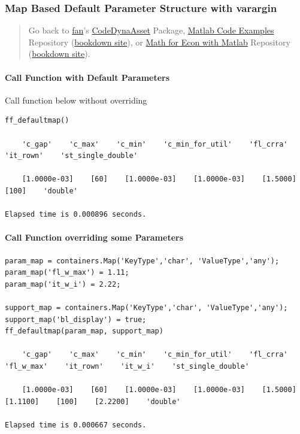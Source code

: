 \documentclass[
]{book}
\begin{document}
\hypertarget{map-based-default-parameter-structure-with-varargin}{%
\subsubsection{Map Based Default Parameter Structure with varargin}\label{map-based-default-parameter-structure-with-varargin}}

\begin{quote}
Go back to \href{http://fanwangecon.github.io/}{fan}'s \href{https://fanwangecon.github.io/CodeDynaAsset/}{CodeDynaAsset} Package, \href{https://fanwangecon.github.io/M4Econ/}{Matlab Code Examples} Repository (\href{https://fanwangecon.github.io/M4Econ/bookdown}{bookdown site}), or \href{https://fanwangecon.github.io/Math4Econ/}{Math for Econ with Matlab} Repository (\href{https://fanwangecon.github.io/Math4Econ/bookdown}{bookdown site}).
\end{quote}

\hypertarget{call-function-with-default-parameters}{%
\paragraph{Call Function with Default Parameters}\label{call-function-with-default-parameters}}

Call function below without overriding

\begin{verbatim}
ff_defaultmap()

    'c_gap'    'c_max'    'c_min'    'c_min_for_util'    'fl_crra'    'it_rown'    'st_single_double'

    [1.0000e-03]    [60]    [1.0000e-03]    [1.0000e-03]    [1.5000]    [100]    'double'

Elapsed time is 0.000896 seconds.
\end{verbatim}

\hypertarget{call-function-overriding-some-parameters}{%
\paragraph{Call Function overriding some Parameters}\label{call-function-overriding-some-parameters}}

\begin{verbatim}
param_map = containers.Map('KeyType','char', 'ValueType','any');
param_map('fl_w_max') = 1.11;
param_map('it_w_i') = 2.22;

support_map = containers.Map('KeyType','char', 'ValueType','any');
support_map('bl_display') = true;
ff_defaultmap(param_map, support_map)

    'c_gap'    'c_max'    'c_min'    'c_min_for_util'    'fl_crra'    'fl_w_max'    'it_rown'    'it_w_i'    'st_single_double'

    [1.0000e-03]    [60]    [1.0000e-03]    [1.0000e-03]    [1.5000]    [1.1100]    [100]    [2.2200]    'double'

Elapsed time is 0.000667 seconds.
\end{verbatim}
\end{document}
